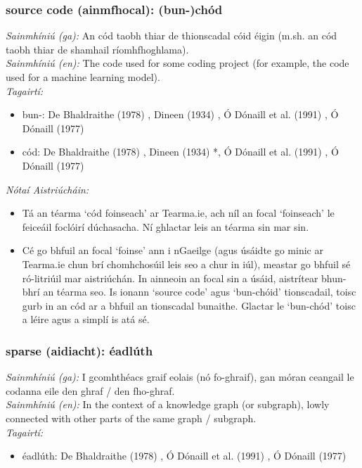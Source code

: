 \subsubsection*{source code (ainmfhocal): (bun-)chód}
 \noindent \textit{Sainmhíniú (ga):} An cód taobh thiar de thionscadal cóid éigin (m.sh. an cód taobh thiar de shamhail ríomhfhoghlama).
\\
 \noindent \textit{Sainmhíniú (en):} The code used for some coding project (for example, the code used for a machine learning model).
\\
 \noindent \textit{Tagairtí:}
\begin{itemize}
	\item bun-: De Bhaldraithe (1978) \cite{de-bhaldraithe}, Dineen (1934) \cite{dineen}, Ó Dónaill et al. (1991) \cite{focloir-beag}, Ó Dónaill (1977) \cite{odonaill}
	\item cód: De Bhaldraithe (1978) \cite{de-bhaldraithe}, Dineen (1934) \cite{dineen}*, Ó Dónaill et al. (1991) \cite{focloir-beag}, Ó Dónaill (1977) \cite{odonaill}
\end{itemize}

 \noindent \textit{Nótaí Aistriúcháin:}
\begin{itemize}
	\item Tá an téarma `cód foinseach' ar Tearma.ie, ach níl an focal `foinseach' le feiceáil foclóirí dúchasacha. Ní ghlactar leis an téarma sin mar sin.
	\item Cé go bhfuil an focal `foinse' ann i nGaeilge (agus úsáidte go minic ar Tearma.ie chun brí chomhchosúil leis seo a chur in iúl), meastar go bhfuil sé ró-litriúil mar aistriúchán. In ainneoin an focal sin a úsáid, aistrítear bhun-bhrí an téarma seo. Is ionann `source code' agus `bun-chóid' tionscadail, toisc gurb in an cód ar a bhfuil an tionscadal bunaithe. Glactar le `bun-chód' toisc a léire agus a simplí is atá sé.
\end{itemize}


\subsubsection*{sparse (aidiacht): éadlúth}
 \noindent \textit{Sainmhíniú (ga):} I gcomhthéacs graif eolais (nó fo-ghraif), gan móran ceangail le codanna eile den ghraf / den fho-ghraf.
\\
 \noindent \textit{Sainmhíniú (en):} In the context of a knowledge graph (or subgraph), lowly connected with other parts of the same graph / subgraph.
\\
 \noindent \textit{Tagairtí:}
\begin{itemize}
	\item éadlúth: De Bhaldraithe (1978) \cite{de-bhaldraithe}, Ó Dónaill et al. (1991) \cite{focloir-beag}, Ó Dónaill (1977) \cite{odonaill}
\end{itemize}

